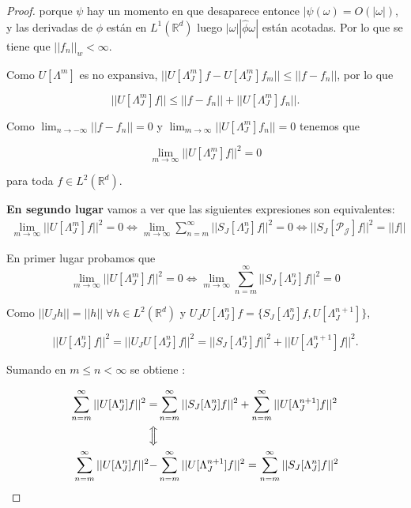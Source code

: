 \begin{proof}
  \noindent porque $\psi$ hay un momento en que desaparece entonce $|\widehat{\psi}(\omega)=O(|\omega|)$, y las derivadas de $\phi$ están en $L^1(\mathbb{R}^d)$ luego $|\omega||\widehat{\phi}\omega|$ están acotadas. Por lo que se tiene que $||f_n||_w < \infty$.

  \medskip

  \noindent Como $U[\Lambda^m]$ es no expansiva, $||U[\Lambda_J^m]f-U[\Lambda_J^m]f_m|| \leq ||f - f_n||$, por lo que 

  $$||U[\Lambda_J^m]f|| \leq || f-f_n|| + ||U[\Lambda_J^m]f_n||.$$

  \noindent Como $\lim_{n\rightarrow -\infty}||f-f_n||=0$ y $\lim_{m\rightarrow\infty}||U[\Lambda_J^m]f_n||=0$ tenemos que 

  $$\lim_{m\rightarrow\infty} ||U[\Lambda_J^m]f||^2=0$$

  \noindent para toda $f \in L^2(\mathbb{R}^d)$. 

  \medskip

  \noindent \textbf{En segundo lugar} vamos a ver que las siguientes expresiones son equivalentes: 
  \begin{align*}
    \lim_{m\rightarrow \infty} ||U[\Lambda_J^m]f||^2=0 \iff \lim_{m\rightarrow\infty} \sum_{n=m}^{\infty} ||S_J[\Lambda_J^n]f||^2=0 \iff ||S_J[\mathcal{P_J}]f||^2 = ||f||
  \end{align*}

  En primer lugar probamos que 
  $$\lim_{m\rightarrow \infty} ||U[\Lambda_J^m]f||^2=0 \iff \lim_{m\rightarrow\infty} \sum_{n=m}^{\infty} ||S_J[\Lambda_J^n]f||^2=0$$
  
  \noindent Como $||U_J h||=||h|| \; \forall h \in L^2(\mathbb{R}^d)$ y $U_J U[\Lambda_J^n]f=\lbrace S_J[\Lambda_J^n]f,U[\Lambda_J^{n+1}]\rbrace$,

 \begin{equation} \label{eq::1.8}
  ||U[\Lambda_J^n]f||^2=||U_JU[\Lambda_J^n]f||^2=||S_J[\Lambda_J^n]f||^2+||U[\Lambda_J^{n+1}]f||^2. 
 \end{equation}

  \noindent Sumando en $m\leq n < \infty$ se obtiene : 
  
  \begin{align*}
    \sum_{n=m}^\infty ||U[\Lambda_J^n]f||^2=&\sum_{n=m}^\infty ||S_J[\Lambda_J^n]f||^2 + \sum_{n=m}^\infty||U[\Lambda_J^{n+1}]f||^2 \\
    \Big\Updownarrow \\
    \sum_{n=m}^\infty ||U[\Lambda_J^n]f||^2 -& \sum_{n=m}^\infty||U[\Lambda_J^{n+1}]f||^2 =\sum_{n=m}^\infty ||S_J[\Lambda_J^n]f||^2  \\
  \end{align*}
  

\end{proof}
